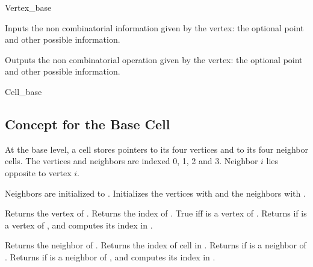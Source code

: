 \begin{ccClass}{Vertex_base}

{Inputs the non combinatorial information given by the vertex: 
the optional point and other possible information.
} 

{Outputs the non combinatorial operation given by the vertex: the
optional point and other possible information.
} 

	\end{ccClass}

	\begin{ccClass}{Cell_base}
	\subsection{Concept for the Base Cell }


At the base level, a cell stores  pointers to its four
vertices and to its four neighbor cells. 
The vertices and neighbors are indexed 0, 1, 2 and 3. Neighbor $i$
lies opposite to vertex $i$.

\ccCreation

\ccGlue
{}
{Neighbors are initialized to .}
\ccGlue
{} 
{Initializes the vertices with  and the neighbors with
.}
                    
\ccAccessFunctions

{Returns the vertex  of \ccVar.
}
\ccGlue
{}
{Returns the index of .
}
\ccGlue
{}
{True iff  is a vertex of \ccVar.}
\ccGlue
{}
{Returns  if  is a vertex of \ccVar, and
computes its index  in \ccVar.}

{Returns  the neighbor  of \ccVar.
}
\ccGlue
{}
{Returns the index of cell  in \ccVar.
}
\ccGlue
{}
{Returns  if  is a neighbor of \ccVar.}
\ccGlue
{}
{Returns  if  is a neighbor of \ccVar,  and
computes its index  in \ccVar.}


\end{ccClass}
